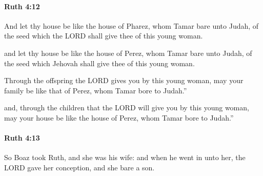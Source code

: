 		\paragraph{Ruth 4:12} %
			\label{RUTH-4-12}

			And let thy house be like the house of Pharez, whom Tamar bare unto Judah, of the seed which the LORD shall give thee of this young woman.

			\begin{versebox}
					\item[BHS] 
					\item[LXX] 
					\item[ASV] and let thy house be like the house of Perez, whom Tamar bare unto Judah, of the seed which Jehovah shall give thee of this young woman.
					\item[NIV] Through the offspring the LORD gives you by this young woman, may your family be like that of Perez, whom Tamar bore to Judah.”
					\item[NRSV] and, through the children that the LORD will give you by this young woman, may your house be like the house of Perez, whom Tamar bore to Judah.”
			\end{versebox}

		\paragraph{Ruth 4:13} %
			\label{RUTH-4-13}

			So Boaz took Ruth, and she was his wife: and when he went in unto her, the LORD gave her conception, and she bare a son.


